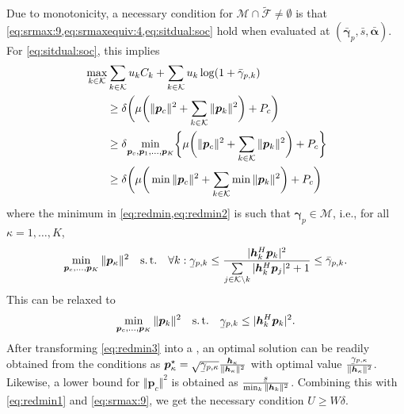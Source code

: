 \documentclass[a4paper,10pt,journal]{IEEEtran}
\newcommand{\st}{\mathrm{s.\,t.}}
\let\vec\bm
\newcommand{\ubar}[1]{\underaccent{\bar}{#1}}
\begin{document}
\begin{IEEEproof}
	Due to monotonicity, a necessary condition for $\mathcal M \cap \tilde{\mathcal F} \neq \emptyset$ is that
	\cref{eq:srmax:9,eq:srmaxequiv:4,eq:sitdual:soc}
	hold when evaluated at $(\bar{\vec\gamma}_p, \bar{s}, \bar{\vec\alpha})$.
	For \cref{eq:sitdual:soc}, this implies
	\begin{subequations} \label{eq:redmin1}
	\begin{align}
		\MoveEqLeft \max_{k\in\mathcal K}  \sum_{k\in\mathcal{K}}  u_k C_k + \sum_{k\in\mathcal{K}} u_k \log(1+ \bar\gamma_{p,k}) \\
		&\ge  \delta \bigg( \mu \bigg( \Vert \vec p_c \Vert^2 + \sum_{k\in\mathcal K} \Vert \vec p_k \Vert^2 \bigg) + P_c \bigg)  \\
		&\ge  \delta \!\min_{\vec p_c, \vec p_1, \dots, \vec p_K}\!\bigg\{ \mu \bigg( \Vert \vec p_c \Vert^2 + \sum_{k\in\mathcal K} \Vert \vec p_k \Vert^2 \bigg) + P_c \bigg\} \label{eq:redmin} \\
		&\ge  \delta \bigg( \mu \bigg( \min \Vert \vec p_c \Vert^2 + \sum_{k\in\mathcal K} \min \Vert \vec p_k \Vert^2 \bigg) + P_c \bigg) \label{eq:redmin2}
	\end{align}
	\end{subequations}
	where the minimum in \cref{eq:redmin,eq:redmin2} is such that $\vec\gamma_p\in\mathcal M$, i.e., for all $\kappa = 1, \dots, K$,
	\begin{equation*}
		\min_{\vec p_c, \dots, \vec p_K} \Vert \vec p_\kappa \Vert^2 \quad\st\quad \forall k : \ubar\gamma_{p,k} \le \frac{|{\vec{h}}_{k}^{H}\vec{p}_{k}|^2}{\sum\limits_{j\in\mathcal{K}\setminus k}|\vec{h}_{k}^{H}\vec{p}_{j}|^2+1} \le \bar\gamma_{p,k}.
	\end{equation*}
	This can be relaxed to
	\begin{equation} \label{eq:redmin3}
		\min_{\vec p_c, \dots, \vec p_K} \Vert \vec p_k \Vert^2 \quad\st\quad \ubar\gamma_{p,k} \le |{\vec{h}}_{k}^{H}\vec{p}_{k}|^2.
	\end{equation}
	After transforming \cref{eq:redmin3} into a , an optimal solution can be readily obtained from the  conditions as $\vec p_{\kappa}^\star = \sqrt{\ubar{\gamma}_{p,\kappa}} \frac{\vec h_\kappa}{\Vert \vec h_\kappa \Vert^2}$ with optimal value $\frac{\ubar{\gamma}_{p,\kappa}}{\Vert \vec h_{\kappa} \Vert^2}$. Likewise, a lower bound for $\Vert\vec p_c\Vert^2$ is obtained as $\frac{\ubar s}{\min_k \Vert \vec h_k \Vert^2}$. Combining this with \cref{eq:redmin1} and \cref{eq:srmax:9}, we get the necessary condition $U \ge W \delta$.


\end{IEEEproof}
\end{document}
